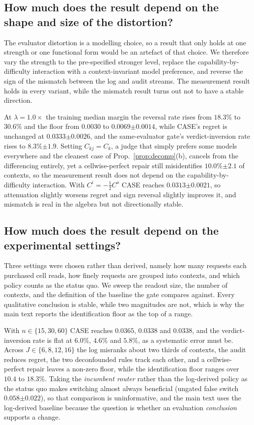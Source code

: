 \documentclass{article}
\theoremstyle{plain}
\theoremstyle{remark}
\newcommand{\se}[1]{{\scriptstyle\pm#1}}
\begin{document}
\subsection{How much does the result depend on the shape and size of the distortion?}
The evaluator distortion is a modelling choice, so a result that only holds at one strength or one
functional form would be an artefact of that choice. We therefore vary the strength to the
pre-specified stronger level, replace the capability-by-difficulty interaction with a
context-invariant model preference, and reverse the sign of the mismatch between the log and audit
streams. The measurement result holds in every variant, while the mismatch result turns out not to
have a stable direction.

At $\lambda=1.0\times$ the training median margin the reversal rate rises from $18.3\%$ to $30.6\%$
and the floor from $0.0030$ to $0.0069\se{0.0014}$, while CASE's regret is unchanged at
$0.0333\se{0.0026}$, and the same-evaluator gate's verdict-inversion rate rises to $8.3\%\se{1.9}$.
Setting $C_{kj}=C_k$, a judge that simply prefers some models everywhere and the cleanest case of
Prop.~\ref{prop:decomp}(b), cancels from the differencing entirely, yet a cellwise-perfect repair
still misidentifies $10.0\%\se{2.1}$ of contexts, so the measurement result does not depend on the
capability-by-difficulty interaction. With $C^i=-\tfrac12C^o$ CASE reaches $0.0313\se{0.0021}$, so
attenuation slightly worsens regret and sign reversal slightly improves it, and mismatch is real in
the algebra but not directionally stable.

\subsection{How much does the result depend on the experimental settings?}
Three settings were chosen rather than derived, namely how many requests each purchased cell reads,
how finely requests are grouped into contexts, and which policy counts as the status quo. We sweep
the readout size, the number of contexts, and the definition of the baseline the gate compares
against. Every qualitative conclusion is stable, while two magnitudes are not, which is why the main
text reports the identification floor as the top of a range.

With $n\in\{15,30,60\}$ CASE reaches $0.0365$, $0.0338$ and $0.0338$, and the verdict-inversion rate
is flat at $6.0\%$, $4.6\%$ and $5.8\%$, as a systematic error must be. Across $J\in\{6,8,12,16\}$ the
log misranks about two thirds of contexts, the audit reduces regret, the two deconfounded rules track
each other, and a cellwise-perfect repair leaves a non-zero floor, while the identification floor
ranges over $10.4$ to $18.3\%$. Taking the \emph{incumbent router} rather than the log-derived policy
as the status quo makes switching almost always beneficial (ungated false switch $0.058\se{0.022}$),
so that comparison is uninformative, and the main text uses the log-derived baseline because the
question is whether an evaluation \emph{conclusion} supports a change.
\end{document}
